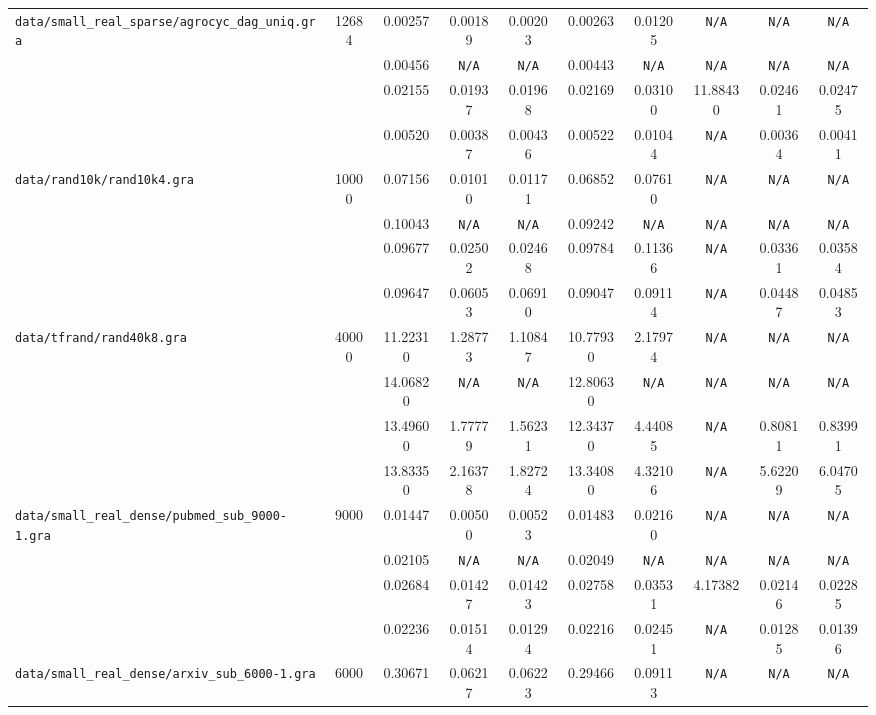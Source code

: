 \documentclass[12pt,a4paper,twoside]{article}
\begin{document}
{\begin{tabular}{ | l | c | c | c | c | c | c | c | c | c | }
\hline
\verb|data/small_real_sparse/agrocyc_dag_uniq.gra| & 12684 & 0.00257 & 0.00189 & 0.00203 & 0.00263 & 0.01205 & \verb|N/A| & \verb|N/A| & \verb|N/A| \\
\verb| | &  & 0.00456 & \verb|N/A| & \verb|N/A| & 0.00443 & \verb|N/A| & \verb|N/A| & \verb|N/A| & \verb|N/A| \\
\verb| | &  & 0.02155 & 0.01937 & 0.01968 & 0.02169 & 0.03100 & 11.88430 & 0.02461 & 0.02475 \\
\verb| | &  & 0.00520 & 0.00387 & 0.00436 & 0.00522 & 0.01044 & \verb|N/A| & 0.00364 & 0.00411 \\
\hline
\verb|data/rand10k/rand10k4.gra| & 10000 & 0.07156 & 0.01010 & 0.01171 & 0.06852 & 0.07610 & \verb|N/A| & \verb|N/A| & \verb|N/A| \\
\verb| | &  & 0.10043 & \verb|N/A| & \verb|N/A| & 0.09242 & \verb|N/A| & \verb|N/A| & \verb|N/A| & \verb|N/A| \\
\verb| | &  & 0.09677 & 0.02502 & 0.02468 & 0.09784 & 0.11366 & \verb|N/A| & 0.03361 & 0.03584 \\
\verb| | &  & 0.09647 & 0.06053 & 0.06910 & 0.09047 & 0.09114 & \verb|N/A| & 0.04487 & 0.04853 \\
\hline
\verb|data/tfrand/rand40k8.gra| & 40000 & 11.22310 & 1.28773 & 1.10847 & 10.77930 & 2.17974 & \verb|N/A| & \verb|N/A| & \verb|N/A| \\
\verb| | &  & 14.06820 & \verb|N/A| & \verb|N/A| & 12.80630 & \verb|N/A| & \verb|N/A| & \verb|N/A| & \verb|N/A| \\
\verb| | &  & 13.49600 & 1.77779 & 1.56231 & 12.34370 & 4.44085 & \verb|N/A| & 0.80811 & 0.83991 \\
\verb| | &  & 13.83350 & 2.16378 & 1.82724 & 13.34080 & 4.32106 & \verb|N/A| & 5.62209 & 6.04705 \\
\hline
\verb|data/small_real_dense/pubmed_sub_9000-1.gra| & 9000 & 0.01447 & 0.00500 & 0.00523 & 0.01483 & 0.02160 & \verb|N/A| & \verb|N/A| & \verb|N/A| \\
\verb| | &  & 0.02105 & \verb|N/A| & \verb|N/A| & 0.02049 & \verb|N/A| & \verb|N/A| & \verb|N/A| & \verb|N/A| \\
\verb| | &  & 0.02684 & 0.01427 & 0.01423 & 0.02758 & 0.03531 & 4.17382 & 0.02146 & 0.02285 \\
\verb| | &  & 0.02236 & 0.01514 & 0.01294 & 0.02216 & 0.02451 & \verb|N/A| & 0.01285 & 0.01396 \\
\hline
\verb|data/small_real_dense/arxiv_sub_6000-1.gra| & 6000 & 0.30671 & 0.06217 & 0.06223 & 0.29466 & 0.09113 & \verb|N/A| & \verb|N/A| & \verb|N/A| \\

\end{tabular}}
\end{document}
